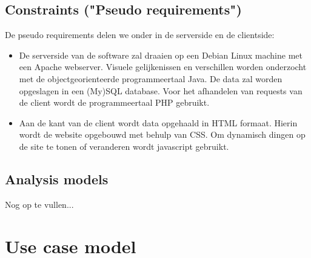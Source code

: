 \documentclass[a4paper,10pt]{article}
\begin{document}
		\subsection{Constraints ("Pseudo requirements")}
			De pseudo requirements delen we onder in de serverside en de clientside:
			\begin{itemize}
				\item De serverside van de software zal draaien op een Debian Linux machine met een Apache webserver. Visuele gelijkenissen en verschillen worden onderzocht met de objectgeorienteerde programmeertaal Java. De data zal worden opgeslagen in een (My)SQL database. Voor het afhandelen van requests van de client wordt de programmeertaal PHP gebruikt.
				\item Aan de kant van de client wordt data opgehaald in HTML formaat. Hierin wordt de website opgebouwd met behulp van CSS. Om dynamisch dingen op de site te tonen of veranderen wordt javascript gebruikt.
			\end{itemize}
				
		\subsection{Analysis models}
		Nog op te vullen...	
	
	\clearpage
\section{Use case model}
\end{document}
